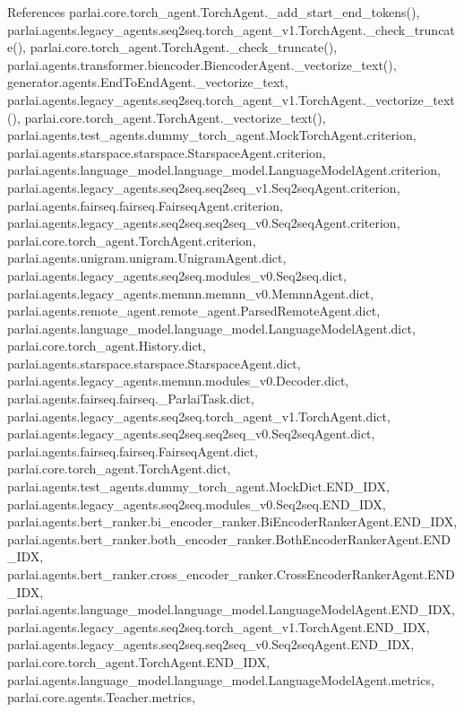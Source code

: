 References parlai.\+core.\+torch\+\_\+agent.\+Torch\+Agent.\+\_\+add\+\_\+start\+\_\+end\+\_\+tokens(), parlai.\+agents.\+legacy\+\_\+agents.\+seq2seq.\+torch\+\_\+agent\+\_\+v1.\+Torch\+Agent.\+\_\+check\+\_\+truncate(), parlai.\+core.\+torch\+\_\+agent.\+Torch\+Agent.\+\_\+check\+\_\+truncate(), parlai.\+agents.\+transformer.\+biencoder.\+Biencoder\+Agent.\+\_\+vectorize\+\_\+text(), generator.\+agents.\+End\+To\+End\+Agent.\+\_\+vectorize\+\_\+text, parlai.\+agents.\+legacy\+\_\+agents.\+seq2seq.\+torch\+\_\+agent\+\_\+v1.\+Torch\+Agent.\+\_\+vectorize\+\_\+text(), parlai.\+core.\+torch\+\_\+agent.\+Torch\+Agent.\+\_\+vectorize\+\_\+text(), parlai.\+agents.\+test\+\_\+agents.\+dummy\+\_\+torch\+\_\+agent.\+Mock\+Torch\+Agent.\+criterion, parlai.\+agents.\+starspace.\+starspace.\+Starspace\+Agent.\+criterion, parlai.\+agents.\+language\+\_\+model.\+language\+\_\+model.\+Language\+Model\+Agent.\+criterion, parlai.\+agents.\+legacy\+\_\+agents.\+seq2seq.\+seq2seq\+\_\+v1.\+Seq2seq\+Agent.\+criterion, parlai.\+agents.\+fairseq.\+fairseq.\+Fairseq\+Agent.\+criterion, parlai.\+agents.\+legacy\+\_\+agents.\+seq2seq.\+seq2seq\+\_\+v0.\+Seq2seq\+Agent.\+criterion, parlai.\+core.\+torch\+\_\+agent.\+Torch\+Agent.\+criterion, parlai.\+agents.\+unigram.\+unigram.\+Unigram\+Agent.\+dict, parlai.\+agents.\+legacy\+\_\+agents.\+seq2seq.\+modules\+\_\+v0.\+Seq2seq.\+dict, parlai.\+agents.\+legacy\+\_\+agents.\+memnn.\+memnn\+\_\+v0.\+Memnn\+Agent.\+dict, parlai.\+agents.\+remote\+\_\+agent.\+remote\+\_\+agent.\+Parsed\+Remote\+Agent.\+dict, parlai.\+agents.\+language\+\_\+model.\+language\+\_\+model.\+Language\+Model\+Agent.\+dict, parlai.\+core.\+torch\+\_\+agent.\+History.\+dict, parlai.\+agents.\+starspace.\+starspace.\+Starspace\+Agent.\+dict, parlai.\+agents.\+legacy\+\_\+agents.\+memnn.\+modules\+\_\+v0.\+Decoder.\+dict, parlai.\+agents.\+fairseq.\+fairseq.\+\_\+\+Parlai\+Task.\+dict, parlai.\+agents.\+legacy\+\_\+agents.\+seq2seq.\+torch\+\_\+agent\+\_\+v1.\+Torch\+Agent.\+dict, parlai.\+agents.\+legacy\+\_\+agents.\+seq2seq.\+seq2seq\+\_\+v0.\+Seq2seq\+Agent.\+dict, parlai.\+agents.\+fairseq.\+fairseq.\+Fairseq\+Agent.\+dict, parlai.\+core.\+torch\+\_\+agent.\+Torch\+Agent.\+dict, parlai.\+agents.\+test\+\_\+agents.\+dummy\+\_\+torch\+\_\+agent.\+Mock\+Dict.\+E\+N\+D\+\_\+\+I\+DX, parlai.\+agents.\+legacy\+\_\+agents.\+seq2seq.\+modules\+\_\+v0.\+Seq2seq.\+E\+N\+D\+\_\+\+I\+DX, parlai.\+agents.\+bert\+\_\+ranker.\+bi\+\_\+encoder\+\_\+ranker.\+Bi\+Encoder\+Ranker\+Agent.\+E\+N\+D\+\_\+\+I\+DX, parlai.\+agents.\+bert\+\_\+ranker.\+both\+\_\+encoder\+\_\+ranker.\+Both\+Encoder\+Ranker\+Agent.\+E\+N\+D\+\_\+\+I\+DX, parlai.\+agents.\+bert\+\_\+ranker.\+cross\+\_\+encoder\+\_\+ranker.\+Cross\+Encoder\+Ranker\+Agent.\+E\+N\+D\+\_\+\+I\+DX, parlai.\+agents.\+language\+\_\+model.\+language\+\_\+model.\+Language\+Model\+Agent.\+E\+N\+D\+\_\+\+I\+DX, parlai.\+agents.\+legacy\+\_\+agents.\+seq2seq.\+torch\+\_\+agent\+\_\+v1.\+Torch\+Agent.\+E\+N\+D\+\_\+\+I\+DX, parlai.\+agents.\+legacy\+\_\+agents.\+seq2seq.\+seq2seq\+\_\+v0.\+Seq2seq\+Agent.\+E\+N\+D\+\_\+\+I\+DX, parlai.\+core.\+torch\+\_\+agent.\+Torch\+Agent.\+E\+N\+D\+\_\+\+I\+DX, parlai.\+agents.\+language\+\_\+model.\+language\+\_\+model.\+Language\+Model\+Agent.\+metrics, parlai.\+core.\+agents.\+Teacher.\+metrics, 